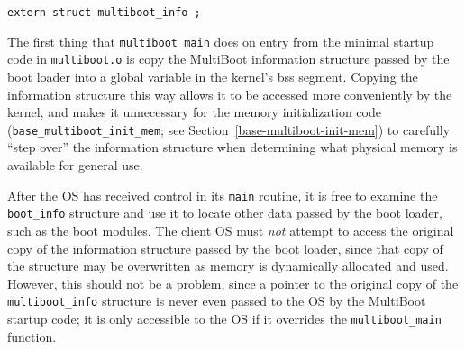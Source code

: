 \label{boot-info}
\begin{apisyn}

	{\tt extern struct multiboot_info ;}
\end{apisyn}
\begin{apidesc}
	The first thing that {\tt multiboot_main} does on entry
	from the minimal startup code in {\tt multiboot.o}
	is copy the MultiBoot information structure passed by the boot loader
	into a global variable in the kernel's bss segment.
	Copying the information structure this way
	allows it to be accessed more conveniently by the kernel,
	and makes it unnecessary for the memory initialization code
	({\tt base_multiboot_init_mem};
	see Section~\ref{base-multiboot-init-mem})
	to carefully ``step over'' the information structure
	when determining what physical memory is available for general use.

	After the OS has received control in its {\tt main} routine,
	it is free to examine the {\tt boot_info} structure
	and use it to locate other data passed by the boot loader,
	such as the boot modules.
	The client OS must \emph{not} attempt to access
	the original copy of the information structure
	passed by the boot loader,
	since that copy of the structure may be overwritten
	as memory is dynamically allocated and used.
	However, this should not be a problem,
	since a pointer to the original copy
	of the {\tt multiboot_info} structure
	is never even passed to the OS by the MultiBoot startup code;
	it is only accessible to the OS
	if it overrides the {\tt multiboot_main} function.
\end{apidesc}

